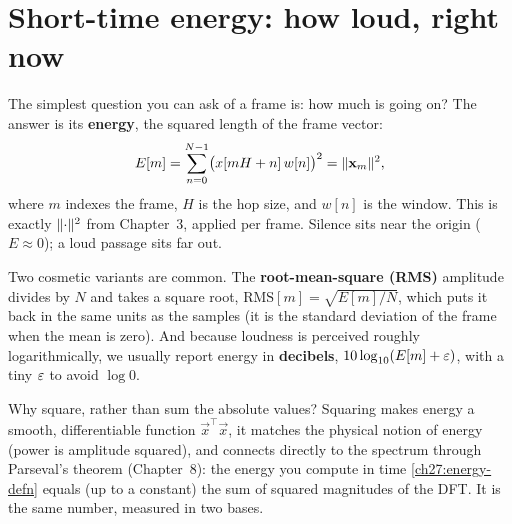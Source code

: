 \section{Short-time energy: how loud, right now}
\label{ch27:energy}

The simplest question you can ask of a frame is: how much is going on? The answer
is its \textbf{energy}, the squared length of the frame vector:
\begin{equation}
\label{ch27:energy-defn}
E[m] = \sum_{n=0}^{N-1} \bigl(x[mH + n]\, w[n]\bigr)^2 = \lVert\mathbf{x}_m\rVert^2,
\end{equation}
where $m$ indexes the frame, $H$ is the hop size, and $w[n]$ is the window. This
is exactly $\lVert\cdot\rVert^2$ from Chapter~3, applied per frame. Silence sits
near the origin ($E \approx 0$); a loud passage sits far out.

Two cosmetic variants are common. The \textbf{root-mean-square (RMS)} amplitude
divides by $N$ and takes a square root, $\text{RMS}[m] = \sqrt{E[m]/N}$, which
puts it back in the same units as the samples (it is the standard deviation of the
frame when the mean is zero). And because loudness is perceived roughly
logarithmically, we usually report energy in \textbf{decibels},
$10\log_{10}(E[m] + \varepsilon)$, with a tiny $\varepsilon$ to avoid $\log 0$.

\begin{whybox}
Why square, rather than sum the absolute values? Squaring makes energy a smooth,
differentiable function $\vec{x}^\top\vec{x}$, it matches the physical
notion of energy (power is amplitude squared), and connects directly to
the spectrum through Parseval's theorem (Chapter~8): the energy you compute in time
\eqref{ch27:energy-defn} equals (up to a constant) the sum of squared magnitudes
of the DFT. It is the same number, measured in two bases.
\end{whybox}

